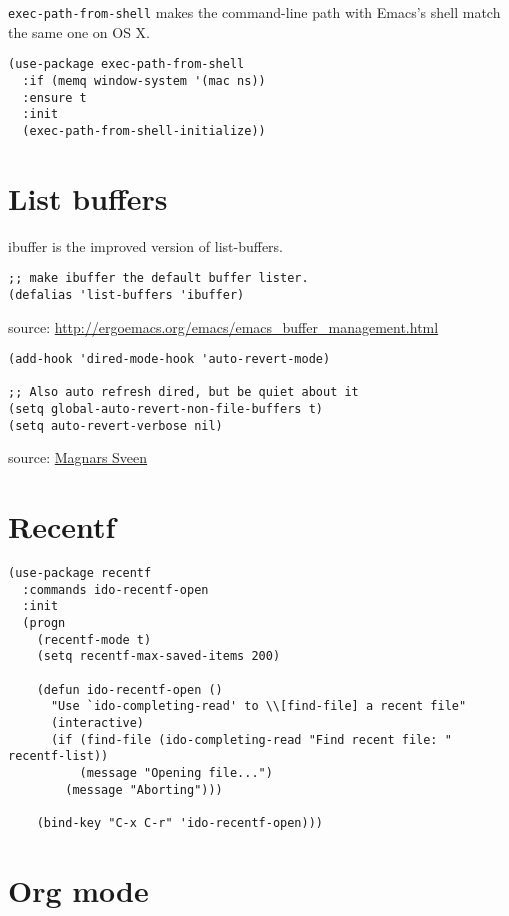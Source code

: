 \documentclass[11pt]{article}
\begin{document}
\verb~exec-path-from-shell~ makes the command-line path with Emacs's shell
match the same one on OS X.

\begin{verbatim}
(use-package exec-path-from-shell
  :if (memq window-system '(mac ns))
  :ensure t
  :init
  (exec-path-from-shell-initialize))
\end{verbatim}

\section{List buffers}
\label{sec-8}

ibuffer is the improved version of list-buffers.

\begin{verbatim}
;; make ibuffer the default buffer lister.
(defalias 'list-buffers 'ibuffer)
\end{verbatim}


source: \url{http://ergoemacs.org/emacs/emacs_buffer_management.html}

\begin{verbatim}
(add-hook 'dired-mode-hook 'auto-revert-mode)

;; Also auto refresh dired, but be quiet about it
(setq global-auto-revert-non-file-buffers t)
(setq auto-revert-verbose nil)
\end{verbatim}

source: \href{http://whattheemacsd.com/sane-defaults.el-01.html}{Magnars Sveen}

\section{Recentf}
\label{sec-9}

\begin{verbatim}
(use-package recentf
  :commands ido-recentf-open
  :init
  (progn
    (recentf-mode t)
    (setq recentf-max-saved-items 200)

    (defun ido-recentf-open ()
      "Use `ido-completing-read' to \\[find-file] a recent file"
      (interactive)
      (if (find-file (ido-completing-read "Find recent file: " recentf-list))
          (message "Opening file...")
        (message "Aborting")))

    (bind-key "C-x C-r" 'ido-recentf-open)))
\end{verbatim}

\section{Org mode}
\label{sec-10}
\end{document}
